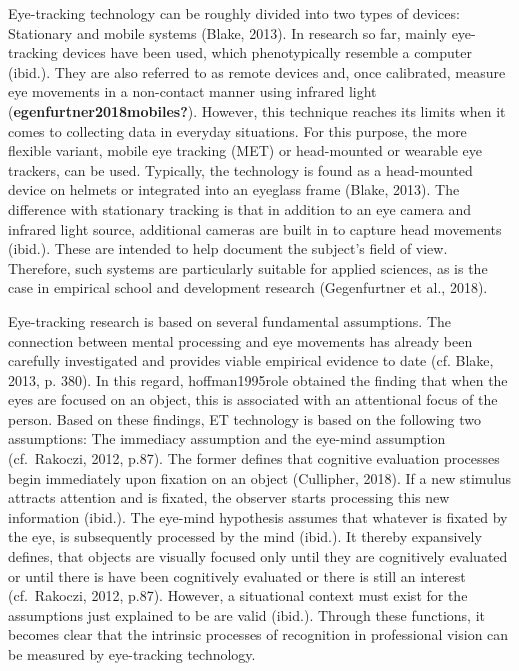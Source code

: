 \documentclass[
  man]{apa6}
\begin{document}
Eye-tracking technology can be roughly divided into two types of devices: Stationary and mobile systems (Blake, 2013). In research so far, mainly eye-tracking devices have been used, which phenotypically resemble a computer (ibid.). They are also referred to as remote devices and, once calibrated, measure eye movements in a non-contact manner using infrared light (\textbf{egenfurtner2018mobiles?}). However, this technique reaches its limits when it comes to collecting data in everyday situations. For this purpose, the more flexible variant, mobile eye tracking (MET) or head-mounted or wearable eye trackers, can be used. Typically, the technology is found as a head-mounted device on helmets or integrated into an eyeglass frame (Blake, 2013). The difference with stationary tracking is that in addition to an eye camera and infrared light source, additional cameras are built in to capture head movements (ibid.). These are intended to help document the subject's field of view. Therefore, such systems are particularly suitable for applied sciences, as is the case in empirical school and development research (Gegenfurtner et al., 2018).

Eye-tracking research is based on several fundamental assumptions. The connection between mental processing and eye movements has already been carefully investigated and provides viable empirical evidence to date (cf. Blake, 2013, p. 380). In this regard, hoffman1995role obtained the finding that when the eyes are focused on an object, this is associated with an attentional focus of the person. Based on these findings, ET technology is based on the following two assumptions: The immediacy assumption and the eye-mind assumption (cf.~Rakoczi, 2012, p.87). The former defines that cognitive evaluation processes begin immediately upon fixation on an object (Cullipher, 2018). If a new stimulus attracts attention and is fixated, the observer starts processing this new information (ibid.). The eye-mind hypothesis assumes that whatever is fixated by the eye, is subsequently processed by the mind (ibid.). It thereby expansively defines, that objects are visually focused only until they are cognitively evaluated or until there is have been cognitively evaluated or there is still an interest (cf.~Rakoczi, 2012, p.87). However, a situational context must exist for the assumptions just explained to be are valid (ibid.). Through these functions, it becomes clear that the intrinsic processes of recognition in professional vision can be measured by eye-tracking technology.
\end{document}
